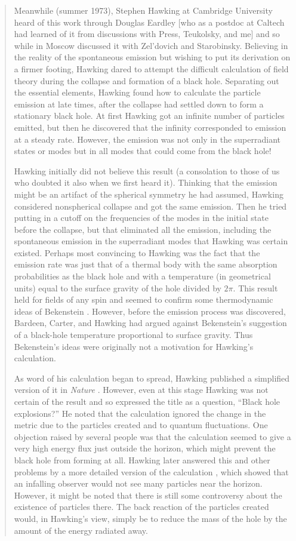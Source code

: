 \documentclass[12pt]{article} \usepackage{latexsym}
\begin{document}
\begin{quotation}
Meanwhile (summer 1973), Stephen Hawking at Cambridge University heard
of this work through Douglas Eardley [who as a postdoc at Caltech had
learned of it from discussions with Press, Teukolsky, and me] and so
while in Moscow discussed it with Zel'dovich and Starobinsky.
Believing in the reality of the spontaneous emission but wishing to
put its derivation on a firmer footing, Hawking dared to attempt the
difficult calculation of field theory during the collapse and
formation of a black hole.  Separating out the essential elements,
Hawking found how to calculate the particle emission at late times,
after the collapse had settled down to form a stationary black hole.
At first Hawking got an infinite number of particles emitted, but then
he discovered that the infinity corresponded to emission at a steady
rate.  However, the emission was not only in the superradiant states
or modes but in all modes that could come from the black hole!

Hawking initially did not believe this result (a consolation to those
of us who doubted it also when we first heard it).  Thinking that the
emission might be an artifact of the spherical symmetry he had
assumed, Hawking considered nonspherical collapse and got the same
emission.  Then he tried putting in a cutoff on the frequencies of the
modes in the initial state before the collapse, but that eliminated
all the emission, including the spontaneous emission in the
superradiant modes that Hawking was certain existed.  Perhaps most
convincing to Hawking was the fact that the emission rate was just
that of a thermal body with the same absorption probabilities as the
black hole and with a temperature (in geometrical units) equal to the
surface gravity of the hole divided by $2\pi$.  This result held for
fields of any spin and seemed to confirm some thermodynamic ideas of
Bekenstein \cite{Bek3}.  However, before the emission process was
discovered, Bardeen, Carter, and Hawking \cite{BCH} had argued against
Bekenstein's suggestion of a black-hole temperature proportional to
surface gravity.  Thus Bekenstein's ideas were originally not a
motivation for Hawking's calculation.

As word of his calculation began to spread, Hawking published a
simplified version of it in \emph{Nature} \cite{Haw1}.  However, even
at this stage Hawking was not certain of the result and so expressed
the title as a question, ``Black hole explosions?''  He noted that the
calculation ignored the change in the metric due to the particles
created and to quantum fluctuations.  One objection raised by several
people was that the calculation seemed to give a very high energy flux
just outside the horizon, which might prevent the black hole from
forming at all.  Hawking later answered this and other problems by a
more detailed version of the calculation \cite{Haw2}, which showed
that an infalling observer would not see many particles near the
horizon.  However, it might be noted that there is still some
controversy about the existence of particles there.  The back reaction
of the particles created would, in Hawking's view, simply be to reduce
the mass of the hole by the amount of the energy radiated away.


\end{quotation}
\end{document}
